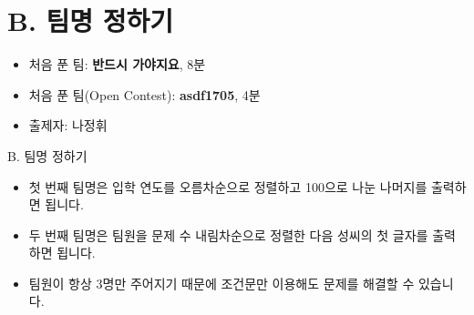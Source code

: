 \def\probno{B}
\def\probtitle{팀명 정하기}

\section{\probno{}. \probtitle{}}

\begin{frame} %
    \sectiontitle{\probno{}}{\probtitle{}}
    \begin{itemize}
        \item 처음 푼 팀: \textbf{반드시 가야지요}, 8분
        \item 처음 푼 팀(Open Contest): \textbf{asdf1705}, 4분
        \item 출제자: 나정휘
    \end{itemize}
\end{frame}

\begin{frame}{\probno{}. \probtitle{}}
    \begin{itemize}
        \item 첫 번째 팀명은 입학 연도를 오름차순으로 정렬하고 100으로 나눈 나머지를 출력하면 됩니다.
        \item 두 번째 팀명은 팀원을 문제 수 내림차순으로 정렬한 다음 성씨의 첫 글자를 출력하면 됩니다.
        \item 팀원이 항상 3명만 주어지기 때문에 조건문만 이용해도 문제를 해결할 수 있습니다.
    \end{itemize}
\end{frame}

